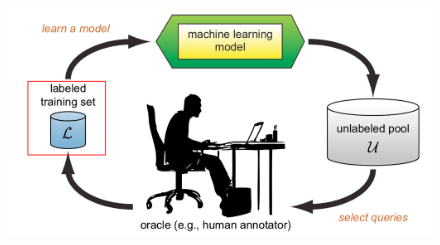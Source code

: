 \documentclass[10pt]{beamer}
\begin{document}
\begin{frame}[fragile]
    \begin{figure}[htp]
        \centering
        \includegraphics[scale=0.3]{images/active_learning_labeled.png}
    \end{figure}
\end{frame}
\end{document}

